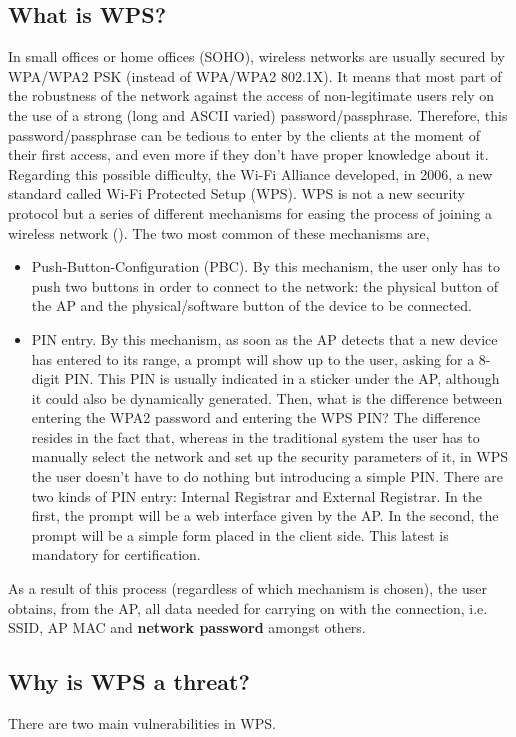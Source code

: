 \documentclass[a4paper,11pt]{article}
\begin{document}
\subsection{What is WPS?}
In small offices or home offices (SOHO), wireless networks are usually secured by WPA/WPA2 PSK (instead of WPA/WPA2 802.1X). It means that most part of the robustness of the network against the access of non-legitimate users rely on the use of a strong (long and ASCII varied) password/passphrase. Therefore, this password/passphrase can be tedious to enter by the clients at the moment of their first access, and even more if they don't have proper knowledge about it. Regarding this possible difficulty, the Wi-Fi Alliance developed, in 2006, a new standard called Wi-Fi Protected Setup (WPS). WPS is not a new security protocol but a series of different mechanisms for easing the process of joining a wireless network (\cite{alliance,wikipedia}). The two most common of these mechanisms are,
\begin{itemize}
\item Push-Button-Configuration (PBC). By this mechanism, the user only has to push two buttons in order to connect to the network: the physical button of the AP and the physical/software button of the device to be connected.
\item PIN entry. By this mechanism, as soon as the AP detects that a new device has entered to its range, a prompt will show up to the user, asking for a 8-digit PIN. This PIN is usually indicated in a sticker under the AP, although it could also be dynamically generated. Then, what is the difference between entering the WPA2 password and entering the WPS PIN? The difference resides in the fact that, whereas in the traditional system the user has to manually select the network and set up the security parameters of it, in WPS the user doesn't have to do nothing but introducing a simple PIN. There are two kinds of PIN entry: Internal Registrar and External Registrar. In the first, the prompt will be a web interface given by the AP. In the second, the prompt will be a simple form placed in the client side. This latest is mandatory for certification.
\end{itemize}
As a result of this process (regardless of which mechanism is chosen), the user obtains, from the AP, all data needed for carrying on with the connection, i.e. SSID, AP MAC and \textbf{network password} amongst others.

\subsection{Why is WPS a threat?}
There are two main vulnerabilities in WPS.
\end{document}
